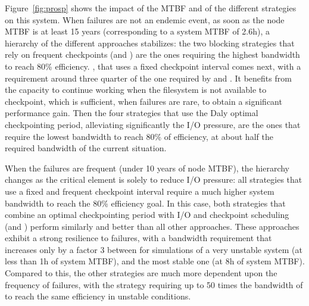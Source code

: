 Figure~\ref{fig:prosp} shows the impact of the MTBF and of the
different strategies on this system. When failures are not an endemic
event, \ie as soon as the node MTBF is at least 15 years
(corresponding to a system MTBF of 2.6h), a hierarchy of the different
approaches stabilizes: the two blocking strategies that rely on
frequent checkpoints (\propfixed and \bfifofixed) are the ones
requiring the highest bandwidth to reach 80\%
efficiency. %
\fifofixed, that uses a fixed checkpoint interval comes next, with a
requirement around three quarter of the one required by \propfixed and
\fifofixed. It benefits from the capacity to continue working when the
filesystem is not available to checkpoint, which is sufficient, when
failures are rare, to obtain a significant performance
gain. %
Then the four strategies that use the Daly optimal checkpointing
period, alleviating significantly the I/O pressure, are the ones that
require the lowest bandwidth to reach 80\% of efficiency, at about
half the required bandwidth of the current
situation. %

When the failures are frequent (under 10 years of node MTBF), the
hierarchy changes as the critical element is solely to reduce I/O
pressure: all strategies that use a fixed and frequent checkpoint
interval require a much higher system bandwidth to reach the 80\%
efficiency goal.  In this case, both strategies that combine an
optimal checkpointing period with I/O and checkpoint scheduling
(\cooperative and \fifodaly) perform similarly and better than all
other approaches. These approaches exhibit a strong resilience to
failures, with a bandwidth requirement that increases only by a factor
3 between for simulations of a very unstable system (at less than 1h of system
MTBF), and the most stable one (at 8h of system MTBF). Compared to
this, the other strategies are much more dependent upon the frequency
of failures, with the \propfixed strategy requiring up to 50 times the
bandwidth of \cooperative to reach the same efficiency in unstable
conditions.
